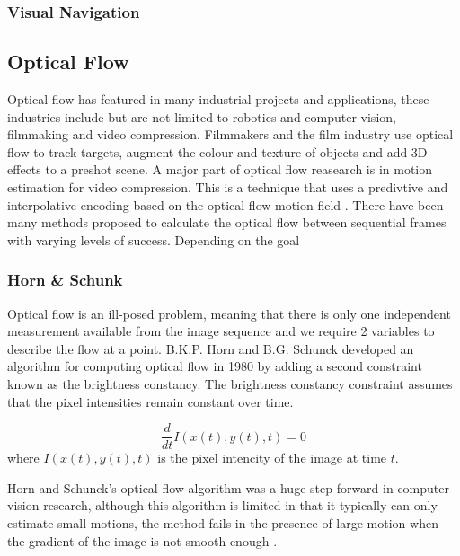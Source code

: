 \documentclass{UoNMCHA}
\numberwithin{equation}{section}
\begin{document}
\subsubsection{Visual Navigation}
\subsubsection{}
\subsubsection{}
\subsection{Optical Flow} %
Optical flow has featured in many industrial projects and applications, these industries include but are not limited to robotics and computer vision, filmmaking and video compression. Filmmakers and the film industry use optical flow to track targets, augment the colour and texture of objects and add 3D effects to a preshot scene. A major part of optical flow reasearch is in motion estimation for video compression. This is a technique that uses a predivtive and interpolative encoding based on the optical flow motion field \citep{le1991MPEG}. %
There have been many methods proposed to calculate the optical flow between sequential frames with varying levels of success. Depending on the goal 
\subsubsection{Horn \& Schunk} %
Optical flow is an ill-posed problem, meaning that there is only one independent measurement available from the image sequence and we require 2 variables to describe the flow at a point. B.K.P. Horn and B.G. Schunck developed an algorithm for computing optical flow in 1980 \citep{horn1981determining} by adding a second constraint known as the brightness constancy. The brightness constancy constraint assumes that the pixel intensities remain constant over time.

\begin{equation}
	\frac{d}{dt} I(x(t), y(t), t) = 0
\end{equation}
where $I(x(t), y(t), t)$ is the pixel intencity of the image at time $t$.

Horn and Schunck's optical flow algorithm was a huge step forward in computer vision research, although this algorithm is limited in that it typically can only estimate small motions, the method fails in the presence of large motion when the gradient of the image is not smooth enough \citep{meinhardt2013horn}.
\end{document}
